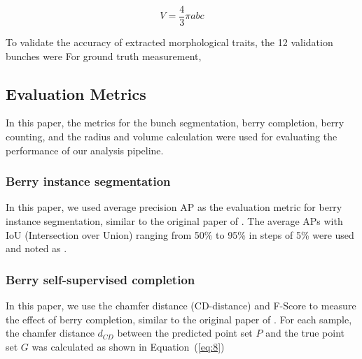 \documentclass[12pt]{article}
\begin{document}
\begin{equation}
    V=\frac{4}{3} \pi a b c
    \label{eq:7}
\end{equation}

To validate the accuracy of extracted morphological traits, the 12 validation bunches  were  
For ground truth measurement, 

\subsection{Evaluation Metrics}

In this paper, the metrics for the bunch segmentation, berry completion, berry counting, and the radius and volume calculation were used for evaluating the performance of our analysis pipeline.

\subsubsection{Berry instance segmentation}
\label{sec:251}
In this paper, we used average precision AP as the evaluation metric for berry instance segmentation, similar to the original paper of  \citep{vu_softgroup_2022}. The average APs with IoU (Intersection over Union) ranging from 50\% to 95\% in steps of 5\% were used and noted as .

\subsubsection{Berry self-supervised completion}

In this paper, we use the chamfer distance (CD-distance) and F-Score to measure the effect of berry completion,  similar to the original paper of \citet{yu_pointr_2021}. 
For each sample, the chamfer distance $d_{CD}$ between the predicted point set $P$ and the true point set $G$ was calculated as shown in Equation~(\ref{eq:8})
\end{document}
